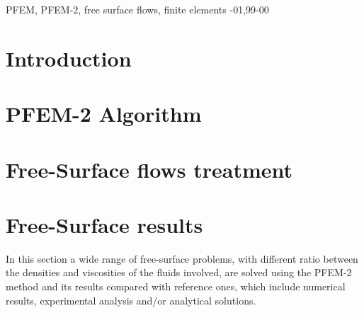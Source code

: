 \documentclass[review]{elsarticle}
\begin{document}
\begin{frontmatter}
\begin{keyword}
PFEM, PFEM-2, free surface flows, finite elements
-01\sep  99-00
\end{keyword}

\end{frontmatter}

\linenumbers
\fboxsep=0mm%

\section{Introduction}\label{Intro}



\section{PFEM-2 Algorithm}\label{PFEM_Algorithm}


\section{Free-Surface flows treatment}\label{Free_surface}



% 

\section{Free-Surface results}\label{FS_results}

In this section a wide range of free-surface problems, with different ratio between the densities and viscosities of the fluids involved, are solved using the PFEM-2 method and its results compared with reference ones, which include numerical results, experimental analysis and/or analytical solutions.
\end{document}
